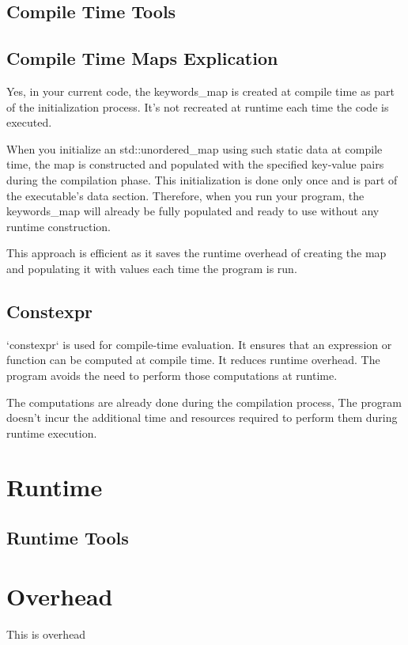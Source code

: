 \documentclass[openany]{report}
\begin{document}
\subsection{Compile Time Tools}


\subsection{Compile Time Maps Explication}

Yes, in your current code,
the keywords_map is created at compile time as part of the initialization process.
It's not recreated at runtime each time the code is executed.


When you initialize an std::unordered_map using such static data at compile time,
the map is constructed and populated with the specified key-value pairs during the compilation phase.
This initialization is done only once and is part of the executable's data section.
Therefore, when you run your program,
the keywords\_map will already be fully populated and ready to use without any runtime construction.

This approach is efficient as it saves the runtime overhead of creating the map
and populating it with values each time the program is run.


\subsection{Constexpr}

`constexpr` is used for compile-time evaluation.
It ensures that an expression or function can be computed at compile time.
It reduces runtime overhead.
The program avoids the need to perform those computations at runtime. 

The computations are already done during the compilation process, 
The program doesn't incur the additional time and resources required
to perform them during runtime execution.

\section{Runtime}

\subsection{Runtime Tools}


\section{Overhead}

This is overhead
\end{document}
